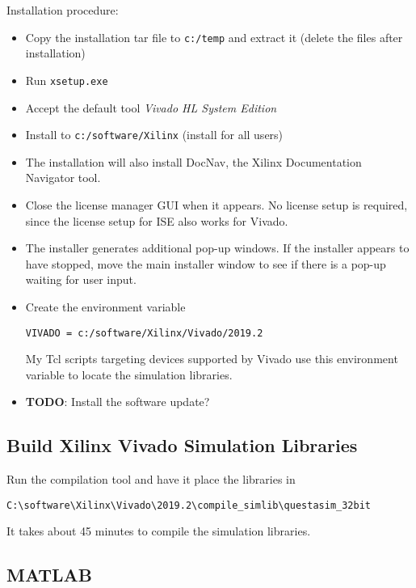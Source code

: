 \documentclass[10pt,twoside]{article}
\begin{document}
Installation procedure:
%
\begin{itemize}
\item Copy the installation tar file to \verb+c:/temp+ and extract it
(delete the files after installation)
\item Run \verb+xsetup.exe+
\item Accept the default tool \emph{Vivado HL System Edition}
\item Install to \verb+c:/software/Xilinx+ (install for all users)
\item The installation will also install DocNav, the Xilinx Documentation Navigator tool.
\item Close the license manager GUI when it appears.
No license setup is required, since the license setup for ISE
also works for Vivado.
\item The installer generates additional pop-up windows. If the installer
appears to have stopped, move the main installer window to see if there
is a pop-up waiting for user input.
\item Create the environment variable

\verb+VIVADO = c:/software/Xilinx/Vivado/2019.2+

My Tcl scripts targeting devices supported by Vivado use this environment
variable to locate the simulation libraries.

\item {\bf TODO}: Install the software update?
\end{itemize}

\subsection{Build Xilinx Vivado Simulation Libraries}

Run the compilation tool and have it place the libraries in

\verb+C:\software\Xilinx\Vivado\2019.2\compile_simlib\questasim_32bit+

\noindent It takes about 45 minutes to compile the simulation libraries.

\clearpage
\subsection{MATLAB}
\end{document}
